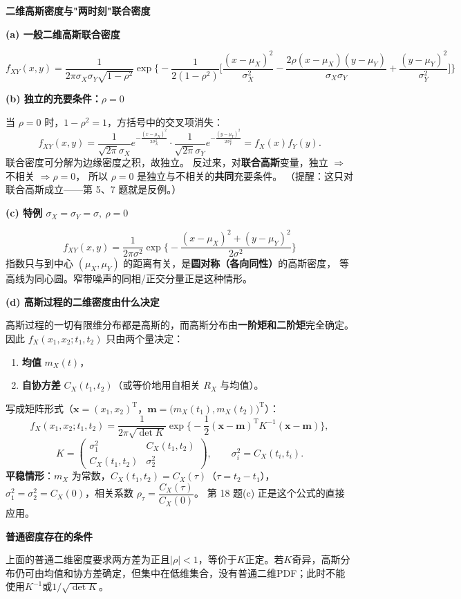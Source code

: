\documentclass[10.5pt,fontset=fandol]{ctexart}
\newcommand{\key}[1]{\par\vspace{4pt}\noindent\textbf{\color{navy}#1}\par\vspace{2pt}}
\begin{document}
\noindent\textbf{二维高斯密度与"两时刻"联合密度}\par\smallskip\begin{tcolorbox}[breakable,colback=qbg,colframe=qbg,boxrule=0pt]\key{(a) 一般二维高斯联合密度}
\[
f_{XY}(x,y)=\frac{1}{2\pi\sigma_X\sigma_Y\sqrt{1-\rho^2}}
\exp\Big\{-\frac{1}{2(1-\rho^2)}\Big[
\frac{(x-\mu_X)^2}{\sigma_X^2}
-\frac{2\rho(x-\mu_X)(y-\mu_Y)}{\sigma_X\sigma_Y}
+\frac{(y-\mu_Y)^2}{\sigma_Y^2}\Big]\Big\}
\]

\key{(b) 独立的充要条件：$\rho=0$}
当 $\rho=0$ 时，$1-\rho^2=1$，方括号中的交叉项消失：
\[
f_{XY}(x,y)=\frac{1}{\sqrt{2\pi}\sigma_X}e^{-\frac{(x-\mu_X)^2}{2\sigma_X^2}}
\cdot\frac{1}{\sqrt{2\pi}\sigma_Y}e^{-\frac{(y-\mu_Y)^2}{2\sigma_Y^2}}
=f_X(x)f_Y(y).
\]
联合密度可分解为边缘密度之积，故独立。
反过来，对\textbf{联合高斯}变量，独立 $\Rightarrow$ 不相关 $\Rightarrow\rho=0$，
所以 $\rho=0$ 是独立与不相关的\textbf{共同}充要条件。
（提醒：这只对联合高斯成立——第 5、7 题就是反例。）

\key{(c) 特例 $\sigma_X=\sigma_Y=\sigma,\ \rho=0$}
\[
\boxed{\,f_{XY}(x,y)=\frac{1}{2\pi\sigma^2}
\exp\Big\{-\frac{(x-\mu_X)^2+(y-\mu_Y)^2}{2\sigma^2}\Big\}\,}
\]
指数只与到中心 $(\mu_X,\mu_Y)$ 的距离有关，是\textbf{圆对称（各向同性）}的高斯密度，
等高线为同心圆。窄带噪声的同相/正交分量正是这种情形。

\key{(d) 高斯过程的二维密度由什么决定}
高斯过程的一切有限维分布都是高斯的，而高斯分布由\textbf{一阶矩和二阶矩}完全确定。
因此 $f_X(x_1,x_2;t_1,t_2)$ 只由两个量决定：
\begin{enumerate}[label=(\roman*),leftmargin=1.7em,itemsep=1pt]
  \item \textbf{均值} $m_X(t)$，
  \item \textbf{自协方差} $C_X(t_1,t_2)$（或等价地用自相关 $R_X$ 与均值）。
\end{enumerate}
写成矩阵形式（$\mathbf{x}=(x_1,x_2)^{\mathrm T}$，$\mathbf{m}=\big(m_X(t_1),m_X(t_2)\big)^{\mathrm T}$）：
\[
f_X(x_1,x_2;t_1,t_2)=\frac{1}{2\pi\sqrt{\det K}}
\exp\Big\{-\frac12(\mathbf{x}-\mathbf{m})^{\mathrm T}K^{-1}(\mathbf{x}-\mathbf{m})\Big\},
\]
\[
K=\begin{pmatrix}\sigma_1^2 & C_X(t_1,t_2)\\ C_X(t_1,t_2) & \sigma_2^2\end{pmatrix},
\qquad \sigma_i^2=C_X(t_i,t_i).
\]
\textbf{平稳情形}：$m_X$ 为常数，$C_X(t_1,t_2)=C_X(\tau)$（$\tau=t_2-t_1$），
$\sigma_1^2=\sigma_2^2=C_X(0)$，相关系数 $\rho_\tau=\dfrac{C_X(\tau)}{C_X(0)}$。
第 18 题(c) 正是这个公式的直接应用。
\key{普通密度存在的条件}
上面的普通二维密度要求两方差为正且$|\rho|<1$，等价于$K$正定。若$K$奇异，高斯分布仍可由均值和协方差确定，但集中在低维集合，没有普通二维PDF；此时不能使用$K^{-1}$或$1/\sqrt{\det K}$。

\end{tcolorbox}
\end{document}

